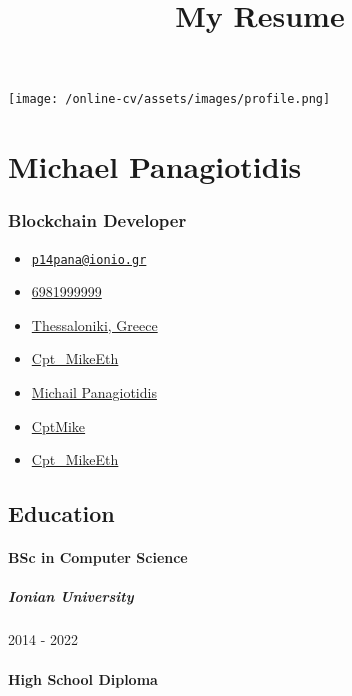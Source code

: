 \documentclass[
  english,
]{article}
\title{My Resume}
\author{}
\date{}
\providecommand{\tightlist}{%
  \setlength{\itemsep}{0pt}\setlength{\parskip}{0pt}}
\begin{document}
\maketitle

\texttt{[image: /online-cv/assets/images/profile.png]}

\hypertarget{michael-panagiotidis}{%
\section{Michael Panagiotidis}\label{michael-panagiotidis}}

\hypertarget{blockchain-developer}{%
\subsubsection{Blockchain Developer}\label{blockchain-developer}}

\begin{itemize}
\tightlist
\item
  \emph{} \href{mailto:p14pana@ionio.gr}{\nolinkurl{p14pana@ionio.gr}}
\item
  \emph{} \href{tel:6981999999}{6981999999}
\item
  \emph{} \href{}{Thessaloniki, Greece}
\item
  \emph{} \href{https://t.me/Cpt_MikeEth}{Cpt\_MikeEth}
\item
  \emph{} \href{https://linkedin.com/in/Michail\%20Panagiotidis}{Michail
  Panagiotidis}
\item
  \emph{} \href{http://github.com/CptMike}{CptMike}
\item
  \emph{} \href{https://twitter.com/Cpt_MikeEth}{Cpt\_MikeEth}
\end{itemize}

\hypertarget{education}{%
\subsection{Education}\label{education}}

\hypertarget{bsc-in-computer-science}{%
\paragraph{BSc in Computer Science}\label{bsc-in-computer-science}}

\hypertarget{ionian-university}{%
\subparagraph{Ionian University}\label{ionian-university}}

2014 - 2022

\hypertarget{high-school-diploma}{%
\paragraph{High School Diploma}\label{high-school-diploma}}
\end{document}
